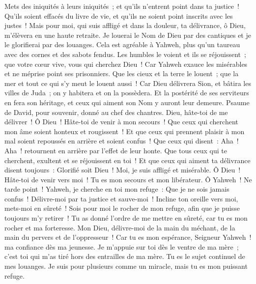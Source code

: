 \begin{multicols}{2}
Mets des iniquités à leurs iniquités~; et qu'ils n'entrent point dans ta justice~!
Qu'ils soient effacés du livre de vie, et qu'ils ne soient point inscrits avec les justes~!
Mais pour moi, qui suis affligé et dans la douleur, ta délivrance, ô Dieu, m'élèvera en une haute retraite.
Je louerai le Nom de Dieu par des cantiques et je le glorifierai par des louanges.
Cela est agréable à Yahweh, plus qu'un taureau avec des cornes et des sabots fendus.
Les humbles le voient et ils se réjouissent~; que votre cœur vive, vous qui cherchez Dieu~!
Car Yahweh exauce les misérables et ne méprise point ses prisonniers.
Que les cieux et la terre le louent~; que la mer et tout ce qui s'y meut le louent aussi~!
Car Dieu délivrera Sion, et bâtira les villes de Juda~; on y habitera et on la possèdera.
Et la postérité de ses serviteurs en fera son héritage, et ceux qui aiment son Nom y auront leur demeure.
\VerseOne{}Psaume de David, pour souvenir, donné au chef des chantres.
Dieu, hâte-toi de me délivrer~! Ô Dieu~! Hâte-toi de venir à mon secours~!
Que ceux qui cherchent mon âme soient honteux et rougissent~! Et que ceux qui prennent plaisir à mon mal soient repoussés en arrière et soient confus~!
Que ceux qui disent~: Aha~! Aha~! retournent en arrière par l'effet de leur honte.
Que tous ceux qui te cherchent, exultent et se réjouissent en toi~! Et que ceux qui aiment ta délivrance disent toujours~: Glorifié soit Dieu~!
Moi, je suis affligé et misérable. Ô Dieu~! Hâte-toi de venir vers moi~! Tu es mon secours et mon libérateur. Ô Yahweh~! Ne tarde point~!
\VerseOne{}Yahweh, je cherche en toi mon refuge~: Que je ne sois jamais confus~!
Délivre-moi par ta justice et sauve-moi~! Incline ton oreille vers moi, mets-moi en sûreté~!
Sois pour moi le rocher de mon refuge, afin que je puisse toujours m'y retirer~! Tu as donné l'ordre de me mettre en sûreté, car tu es mon rocher et ma forteresse.
Mon Dieu, délivre-moi de la main du méchant, de la main du pervers et de l'oppresseur~!
Car tu es mon espérance, Seigneur Yahweh~! ma confiance dès ma jeunesse.
Je m'appuie sur toi dès le ventre de ma mère~; c'est toi qui m'as tiré hors des entrailles de ma mère. Tu es le sujet continuel de mes louanges.
Je suis pour plusieurs comme un miracle, mais tu es mon puissant refuge.

\end{multicols}
